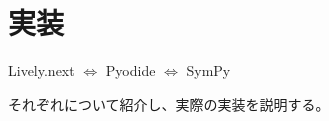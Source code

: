 \chapter{実装} \label{implementation}

Lively.next\cite{Lively.next}
$\Leftrightarrow$
Pyodide\cite{Pyodide}
$\Leftrightarrow$
SymPy\cite{SymPy}

それぞれについて紹介し、実際の実装を説明する。


